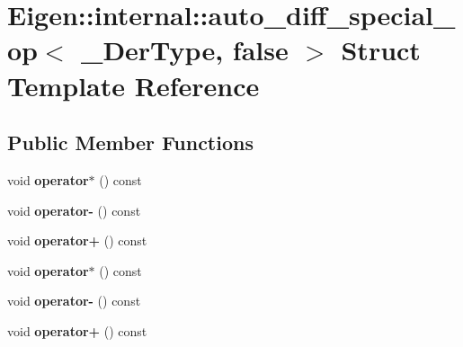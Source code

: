 \hypertarget{struct_eigen_1_1internal_1_1auto__diff__special__op_3_01___der_type_00_01false_01_4}{}\section{Eigen\+:\+:internal\+:\+:auto\+\_\+diff\+\_\+special\+\_\+op$<$ \+\_\+\+Der\+Type, false $>$ Struct Template Reference}
\label{struct_eigen_1_1internal_1_1auto__diff__special__op_3_01___der_type_00_01false_01_4}
\subsection*{Public Member Functions}
\begin{DoxyCompactItemize}
\item 
\mbox{\label{struct_eigen_1_1internal_1_1auto__diff__special__op_3_01___der_type_00_01false_01_4_a5d5dea5443f269bb350b714091e70911}} 
void {\bfseries operator$\ast$} () const
\item 
\mbox{\label{struct_eigen_1_1internal_1_1auto__diff__special__op_3_01___der_type_00_01false_01_4_a9df1717b1bdfc3c8a53ac469be9f3077}} 
void {\bfseries operator-\/} () const
\item 
\mbox{\label{struct_eigen_1_1internal_1_1auto__diff__special__op_3_01___der_type_00_01false_01_4_a06f7e0a882b7034b19f27eb593a321c7}} 
void {\bfseries operator+} () const
\item 
\mbox{\label{struct_eigen_1_1internal_1_1auto__diff__special__op_3_01___der_type_00_01false_01_4_a5d5dea5443f269bb350b714091e70911}} 
void {\bfseries operator$\ast$} () const
\item 
\mbox{\label{struct_eigen_1_1internal_1_1auto__diff__special__op_3_01___der_type_00_01false_01_4_a9df1717b1bdfc3c8a53ac469be9f3077}} 
void {\bfseries operator-\/} () const
\item 
\mbox{\label{struct_eigen_1_1internal_1_1auto__diff__special__op_3_01___der_type_00_01false_01_4_a06f7e0a882b7034b19f27eb593a321c7}} 
void {\bfseries operator+} () const
\end{DoxyCompactItemize}


